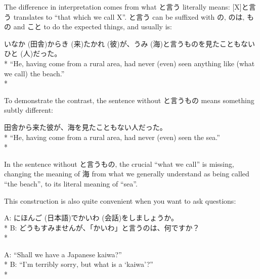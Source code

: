 \documentclass[11pt, b5paper, twoside, openright, onecolumn]{book}
\makeatletter
\newcommand*{\rubystack}[2]{{\relscale{0.5}%
  \begin{tabular}[b]{@{}c@{}}%
    {#1}\\%
   {\textscale{2}{#2}}%
  \end{tabular}}%
}
\DeclareRobustCommand*{\ruby}[2]{%
  \mbox{%
    \setlength{\parskip}{0ex}%
    \BeginAccSupp{method=pdfstringdef,ActualText={#1}}%
      \rubystack{\phantom{#2}}{#1}%
      \llap{%
        \rubystack{#2}{\phantom{#1}}%
      }%
    \EndAccSupp{}%
  }%
}
\renewcommand*{\ruby}[2]{#2 (#1)}%
\newenvironment{exampleblock}{
\setlength{\parindent}{0.6in}
\begin{minipage}[t]{\dimexpr\textwidth-\parindent}}
{\end{minipage}}
\makeatother
\begin{document}
The difference in interpretation comes from what と言う literally means: [X]と言う translates to “that which we call X”. と言う can be suffixed with の‚ のは‚ もの and こと to do the expected things‚ and usually is:

\vspace{0.4cm}
\begin{exampleblock}
\ruby{田舎}{いなか}から\ruby{来}{き}た\ruby{彼}{かれ}が、\ruby{海}{うみ}と言うものを見たこともない\ruby{人}{ひと}だった。 \\* 
“He‚ having come from a rural area‚ had never (even) seen anything like (what we call) the beach.” \\* 
\end{exampleblock}
\vspace{0.2cm}

To demonstrate the contrast‚ the sentence without と言うもの means something subtly different:

\vspace{0.4cm}
\begin{exampleblock}
田舎から来た彼が、海を見たこともない人だった。 \\* 
“He‚ having come from a rural area‚ had never (even) seen the sea.” \\* 
\end{exampleblock}
\vspace{0.2cm}

In the sentence without と言うもの‚ the crucial “what we call” is missing‚ changing the meaning of 海 from what we generally understand as being called “the beach”‚ to its literal meaning of “sea”.

This construction is also quite convenient when you want to ask questions:

\vspace{0.4cm}
\begin{exampleblock}
A: \ruby{日本語}{にほんご}で\ruby{会話}{かいわ}をしましょうか。 \\* 
B: どうもすみませんが、「かいわ」と言うのは、何ですか？ \\* 
\end{exampleblock}
\vspace{0.2cm}

\begin{exampleblock}
A: “Shall we have a Japanese kaiwa?” \\* 
B: “I’m terribly sorry‚ but what is a ‘kaiwa’?” \\* 
\end{exampleblock}
\vspace{0.2cm}
\end{document}
